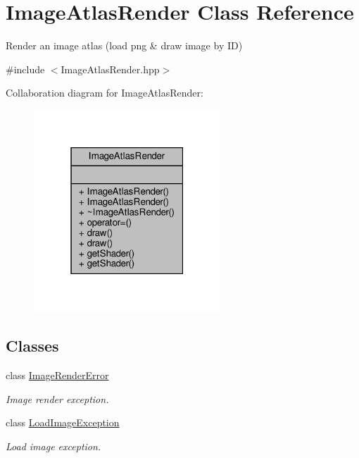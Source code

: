 \hypertarget{class_image_atlas_render}{}\section{Image\+Atlas\+Render Class Reference}
\label{class_image_atlas_render}


Render an image atlas (load png \& draw image by ID)  




{\ttfamily \#include $<$Image\+Atlas\+Render.\+hpp$>$}



Collaboration diagram for Image\+Atlas\+Render\+:
\nopagebreak
\begin{figure}[H]
\begin{center}
\leavevmode
\includegraphics[width=199pt]{class_image_atlas_render__coll__graph}
\end{center}
\end{figure}
\subsection*{Classes}
\begin{DoxyCompactItemize}
\item 
class \hyperlink{class_image_atlas_render_1_1_image_render_error}{Image\+Render\+Error}
\begin{DoxyCompactList}\small\item\em Image render exception. \end{DoxyCompactList}\item 
class \hyperlink{class_image_atlas_render_1_1_load_image_exception}{Load\+Image\+Exception}
\begin{DoxyCompactList}\small\item\em Load image exception. \end{DoxyCompactList}\end{DoxyCompactItemize}

